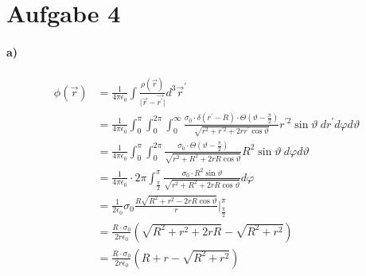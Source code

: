 \documentclass{article}
\newcommand{\epsz}{\epsilon_0}
\begin{document}
\newpage
\section*{Aufgabe 4}
\paragraph{a)}
\begin{align*}
	\phi(\vec r) 
	&= \frac{1}{4\pi\epsz} \int \frac{\rho(\vec r)}{\vert \vec r - \vec{
		r^\prime} \vert} d^3 \vec r^\prime \\
	&= \frac{1}{4\pi\epsz} 
		\int_0^\pi \int_0^{2\pi} \int_0^\infty
		\frac{
		\sigma_0 \cdot \delta(r^\prime - R) \cdot \Theta
		\left( \vartheta - \frac \pi 2 \right)}
		{\sqrt{ r^2 + r^{\prime 2} + 2 r r^\prime \cos\vartheta }}
		r^{\prime 2} \sin\vartheta \
		dr^\prime d\varphi d\vartheta \\
	&= \frac{1}{4\pi\epsz} 
		\int_0^\pi \int_0^{2\pi}
		\frac{
		\sigma_0 \cdot \Theta 
		\left( \vartheta - \frac \pi 2 \right)}
		{\sqrt{ r^2  + R^2 + 2 r R \cos\vartheta }}
		R^2 \sin\vartheta \
		d\varphi d\vartheta \\
	&= \frac{1}{4\pi\epsz} \cdot 2\pi
		\int_{\frac \pi 2}^{\pi}
		\frac{\sigma_0 \cdot R^2 \sin\vartheta}
		{\sqrt{ r^2  + R^2 + 2 r R \cos\vartheta }}
		d\varphi \\
	&= \frac{1}{2\epsz} \sigma_0 \frac{R 
	\sqrt{R^2 + r^2 - 2rR\cos\vartheta}}{r} 
	|_{\frac \pi 2}^\pi \\
	&= \frac{R \cdot \sigma_0}{2 r \epsz} \left(
		\sqrt{R^2 + r^2 + 2rR} - \sqrt{R^2 + r^2}
	\right) \\
	&= \frac{R \cdot \sigma_0}{2 r \epsz} \left(
		R + r - \sqrt{R^2 + r^2}
	\right) \\
\end{align*}
\end{document}
